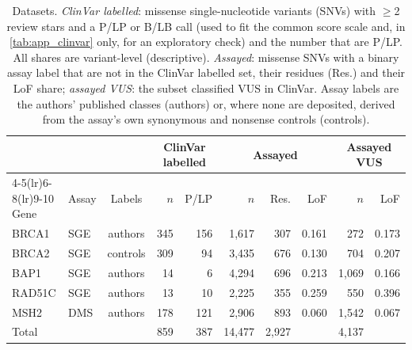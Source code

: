 \begin{table}[t]
\centering
\caption{Datasets. \emph{ClinVar labelled}: missense single-nucleotide variants (SNVs) with $\ge$2 review stars and a P/LP or B/LB call (used to fit the common score scale and, in \cref{tab:app_clinvar} only, for an exploratory check) and the number that are P/LP. All shares are variant-level (descriptive). \emph{Assayed}: missense SNVs with a binary assay label
that are not in the ClinVar labelled set, their residues (Res.) and their LoF share; \emph{assayed VUS}: the subset classified VUS in
ClinVar. Assay labels are the authors' published classes (authors) or, where none are deposited, derived from the
assay's own synonymous and nonsense controls (controls).}\label{tab:data}
\setlength{\tabcolsep}{4.5pt}
\begin{tabular}{llcrrrrrrr}
\toprule
 & & & \multicolumn{2}{c}{ClinVar labelled} & \multicolumn{3}{c}{Assayed} & \multicolumn{2}{c}{Assayed VUS}\\
\cmidrule(lr){4-5}\cmidrule(lr){6-8}\cmidrule(lr){9-10}
Gene & Assay & Labels & $n$ & P/LP & $n$ & Res. & LoF & $n$ & LoF\\
\midrule
BRCA1 & SGE \cite{Findlay2018} & authors & 345 & 156 & 1,617 & 307 & 0.161 & 272 & 0.173 \\
BRCA2 & SGE \cite{Huang2025} & controls & 309 & 94 & 3,435 & 676 & 0.130 & 704 & 0.207 \\
BAP1 & SGE \cite{Waters2024} & authors & 14 & 6 & 4,294 & 696 & 0.213 & 1,069 & 0.166 \\
RAD51C & SGE \cite{OlveraLen2024} & authors & 13 & 10 & 2,225 & 355 & 0.259 & 550 & 0.396 \\
MSH2 & DMS \cite{Jia2021} & authors & 178 & 121 & 2,906 & 893 & 0.060 & 1,542 & 0.067 \\
\midrule
Total & & & 859 & 387 & 14,477 & 2,927 & & 4,137 & \\
\bottomrule
\end{tabular}
\end{table}
